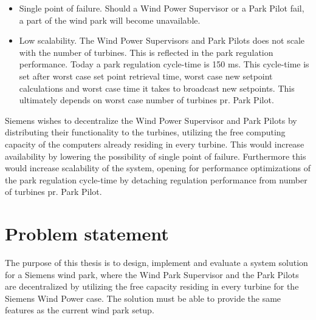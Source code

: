 \begin{itemize} 
	\item Single point of failure. Should a Wind Power Supervisor or a Park Pilot fail, a part of the wind park will become unavailable.
	\item Low scalability. The Wind Power Supervisors and Park Pilots does not scale with the number of turbines. This is reflected in the park regulation performance. Today a park regulation cycle-time is 150 ms. This cycle-time is set after worst case set point retrieval time, worst case new setpoint calculations and worst case time it takes to broadcast new setpoints. This ultimately depends on worst case number of turbines pr. Park Pilot.
\end{itemize}

Siemens wishes to decentralize the Wind Power Supervisor and Park Pilots by distributing their functionality to the turbines, utilizing the free computing capacity of the computers already residing in every turbine. This would increase availability by lowering the possibility of single point of failure. Furthermore this would increase scalability of the system, opening for performance optimizations of the park regulation cycle-time by detaching regulation performance from number of turbines pr. Park Pilot. 

\section{Problem statement}
\label{sec:problemStatement}

The purpose of this thesis is to design, implement and evaluate a system solution for a Siemens wind park, where the Wind Park Supervisor and the Park Pilots are decentralized by utilizing the free capacity residing in every turbine for the Siemens Wind Power case. The solution must be able to provide the same features as the current wind park setup. 

\makeatletter
\newcommand{\labitem}[2]{%
	\def\@itemlabel{''\textbf{#1}''}
	\item
	\def\@currentlabel{\textit{#1}}\label{#2}}
\makeatother

